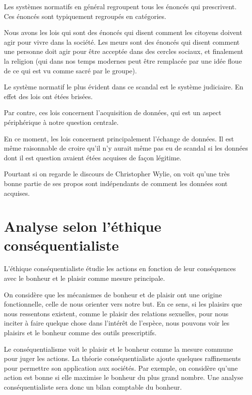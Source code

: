 \documentclass[11pt]{article}
\newcommand{\philnewpage}{}
\begin{document}
Les systèmes normatifs en général regroupent tous les énoncés qui prescrivent.
Ces énoncés sont typiquement regroupés en catégories.

Nous avons les lois qui sont des énoncés qui disent comment les citoyens doivent
agir pour vivre dans la société.  Les meurs sont des énoncés qui disent comment
une personne doit agir pour être acceptée dans des cercles sociaux, et
finalement la religion (qui dans nos temps modernes peut être remplacée par une
idée floue de ce qui est vu comme sacré par le groupe).

Le système normatif le plus évident dans ce scandal est le système judiciaire.
En effet des lois ont étées brisées.


Par contre, ces lois concernent l'acquisition de données, qui est un aspect
périphérique à notre question centrale.

En ce moment, les lois concernent principalement l'échange de données.  Il est
même raisonnable de croire qu'il n'y aurait même pas eu de scandal si les
données dont il est question avaient étées acquises de façon légitime.

Pourtant si on regarde le discours de Christopher Wylie, on voit qu'une très
bonne partie de ses propos sont indépendants de comment les données sont
acquises.



\philnewpage
\section{Analyse selon l'éthique conséquentialiste}

L'éthique conséquentialiste étudie les actions en fonction de leur conséquences
avec le bonheur et le plaisir comme mesure principale.

On considère que les mécanismes de bonheur et de plaisir ont une origine
fonctionnelle, celle de nous orienter vers notre but. En ce sens, si les
plaisirs que nous ressentons existent, comme le plaisir des relations sexuelles,
pour nous inciter à faire quelque chose dans l'intérêt de l'espèce, nous pouvons
voir les plaisirs et le bonheur comme des outils prescriptifs.

Le conséquentialisme voit le plaisir et le bonheur comme la mesure commune pour
juger les actions. La théorie conséquentialiste ajoute quelques raffinements
pour permettre son application aux sociétés. Par exemple, on considère qu'une
action est bonne si elle maximise le bonheur du plus grand nombre. Une analyse
conséquentialiste sera donc un bilan comptable du bonheur.
\end{document}

